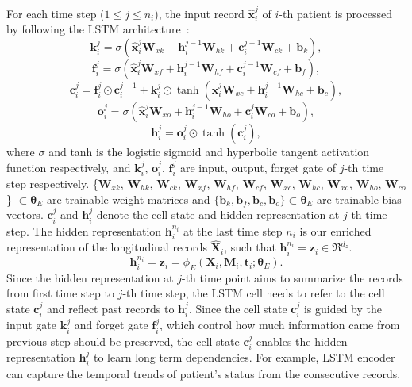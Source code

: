 For each time step ($1 \leq j \leq n_i$), the input record $\hat{\mathbf{x}}_i^j$ of $i$-th patient is processed by following the LSTM architecture~\cite{yu2019review}:
\begin{equation}
    \mathbf{k}^j_i = \sigma(\hat{\mathbf{x}}^j_i \mathbf{W}_{xk} + \mathbf{h}_i^{j-1} \mathbf{W}_{hk} + \mathbf{c}_i^{j-1} \mathbf{W}_{ck} + \mathbf{b}_k),
\end{equation}
\begin{equation}
    \mathbf{f}^j_i = \sigma(\hat{\mathbf{x}}^j_i \mathbf{W}_{xf} + \mathbf{h}^{j-1}_i \mathbf{W}_{hf} + \mathbf{c}^{j-1}_i \mathbf{W}_{cf} + \mathbf{b}_f),
\end{equation}
\begin{equation}
    \mathbf{c}^j_i = \mathbf{f}^j_i \odot \mathbf{c}^{j-1}_i + \mathbf{k}^j_i \odot \operatorname{tanh}(\hat{\mathbf{x}}_i^j \mathbf{W}_{xc} + \mathbf{h}^{j - 1}_i \mathbf{W}_{hc} + \mathbf{b}_c),
\end{equation}
\begin{equation}
    \mathbf{o}^j_i = \sigma(\hat{\mathbf{x}}_i^j \mathbf{W}_{xo} + \mathbf{h}^{j-1}_i \mathbf{W}_{ho} + \mathbf{c}^j_i \mathbf{W}_{co} + \mathbf{b}_o),
\end{equation}
\begin{equation}
    \mathbf{h}^j_i = \mathbf{o}^j_i \odot \operatorname{tanh}(\mathbf{c}^j_i),
\end{equation}
where $\sigma$ and tanh is the logistic sigmoid and hyperbolic tangent activation function respectively, and $\mathbf{k}^j_i$, $\mathbf{o}^j_i$, $\mathbf{f}^j_i$ are input, output, forget gate of $j$-th time step respectively. \{$\mathbf{W}_{xk}$, $\mathbf{W}_{hk}$, $\mathbf{W}_{ck}$, $\mathbf{W}_{xf}$, $\mathbf{W}_{hf}$, $\mathbf{W}_{cf}$, $\mathbf{W}_{xc}$, $\mathbf{W}_{hc}$, $\mathbf{W}_{xo}$, $\mathbf{W}_{ho}$, $\mathbf{W}_{co}$\} $\subset \mathbf{\theta}_E$ are trainable weight matrices and $\{\mathbf{b}_k, \mathbf{b}_f, \mathbf{b}_c, \mathbf{b}_o\} \subset \mathbf{\theta}_E$ are trainable bias vectors. $\mathbf{c}_i^j$ and $\mathbf{h}_i^j$ denote the cell state and hidden representation at $j$-th time step. The hidden representation $\mathbf{h}_i^{n_i}$ at the last time step $n_i$ is our enriched representation of the longitudinal records $\hat{\mathbf{X}}_i$, such that $\mathbf{h}_i^{n_i} = \mathbf{z}_i \in \Re^{d_z}$.
\begin{equation}
    \mathbf{h}_i^{n_i} = \mathbf{z}_i = \phi_E(\mathbf{X}_i, \mathbf{M}_i, \mathbf{t}_i; \mathbf{\theta}_E).
\end{equation}
Since the hidden representation at $j$-th time point aims to summarize the records from first time step to $j$-th time step, the LSTM cell needs to refer to the cell state $\mathbf{c}_i^j$ and reflect past records to $\mathbf{h}_i^j$. Since the cell state $\mathbf{c}_i^j$ is guided by the input gate $\mathbf{k}_i^j$ and forget gate $\mathbf{f}_i^j$, which control how much information came from previous step should be preserved, the cell state $\mathbf{c}_i^j$ enables the hidden representation $\mathbf{h}_i^j$ to learn long term dependencies. For example, LSTM encoder can capture the temporal trends of patient's status from the consecutive records.

